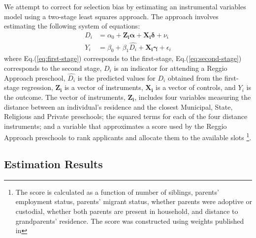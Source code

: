 We attempt to correct for selection bias by estimating an instrumental variables model using a two-stage least squares approach. The approach involves estimating the following system of equations:
\begin{align}
D_i &= \alpha_0 + \bm{Z_i \alpha} + \bm{X_i \delta} + \nu_i \label{eq:first-stage}\\
Y_i &= \beta_0 + \beta_1 \hat{D_i} + \bm{X_i \gamma} + \epsilon_i \label{eq:second-stage}
\end{align}
where Eq.(\ref{eq:first-stage}) corresponds to the first-stage, Eq.(\ref{eq:second-stage}) corresponds to the second stage, $D_i$ is an indicator for attending a Reggio Approach preschool, $\hat{D_i}$ is the predicted values for $D_i$ obtained from the first-stage regression, $\bm{Z_i}$ is a vector of instruments, $\bm{X_i}$ is a vector of controls, and $Y_i$ is the outcome. The vector of instruments, $\bm{Z_i}$, includes four variables measuring the distance between an individual's residence and the closest Municipal, State, Religious and Private preschools; the squared terms for each of the four distance instruments; and a variable that approximates a score used by the Reggio Approach preschools to rank applicants and allocate them to the available slots \footnote{The score is calculated as a function of number of siblings, parents' employment status, parents' migrant status, whether parents were adoptive or custodial, whether both parents are present in household, and distance to grandparents' residence. The score was constructed using weights published in }.
\subsection{Estimation Results}\label{appendix:iv}
